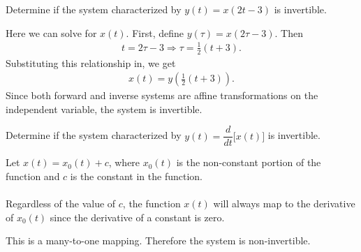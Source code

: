 \documentclass{report}
\begin{document}
\begin{example}
    Determine if the system characterized by $y(t)=x(2t-3)$ is invertible.
\end{example}
\begin{solution}
    Here we can solve for $x(t)$. First, define $y(\tau)=x(2\tau-3)$. Then 
    \begin{align*}
        t = 2\tau - 3 \Longrightarrow \tau = \frac{1}{2}\left(t+3\right).
    \end{align*}
    Substituting this relationship in, we get 
    \begin{align*}
        x(t) = y\left(\frac{1}{2}(t+3)\right).
    \end{align*}
    Since both forward and inverse systems are affine transformations on the independent variable, the system is invertible.
\end{solution}

\begin{example}
    Determine if the system characterized by $y(t)=\dfrac{d}{dt}\big[x(t)\big]$ is invertible.
\end{example}
\begin{solution}
    Let $x(t)=x_0(t)+c$, where $x_0(t)$ is the non-constant portion of the function and $c$ is the constant in the function.
    \\ \\
    Regardless of the value of $c$, the function $x(t)$  will always map to the derivative of $x_0(t)$ since the derivative of a constant is zero. 
    \begin{center}
    \end{center}
    This is a many-to-one mapping. Therefore the system is non-invertible.
\end{solution}
\end{document}
